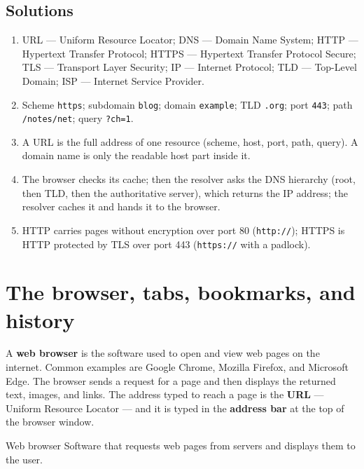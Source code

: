 \subsection*{Solutions}
\begingroup\small
\begin{enumerate}[label=\arabic*.]
  \item URL --- Uniform Resource Locator; DNS --- Domain Name System; HTTP
    --- Hypertext Transfer Protocol; HTTPS --- Hypertext Transfer Protocol
    Secure; TLS --- Transport Layer Security; IP --- Internet Protocol; TLD
    --- Top-Level Domain; ISP --- Internet Service Provider.
  \item Scheme \texttt{https}; subdomain \texttt{blog}; domain
    \texttt{example}; TLD \texttt{.org}; port \texttt{443}; path
    \texttt{/notes/net}; query \texttt{?ch=1}.
  \item A URL is the full address of one resource (scheme, host, port,
    path, query). A domain name is only the readable host part inside it.
  \item The browser checks its cache; then the resolver asks the DNS
    hierarchy (root, then TLD, then the authoritative server), which returns
    the IP address; the resolver caches it and hands it to the browser.
  \item HTTP carries pages without encryption over port 80
    (\texttt{http://}); HTTPS is HTTP protected by TLS over port 443
    (\texttt{https://} with a padlock).
\end{enumerate}
\endgroup

\section{The browser, tabs, bookmarks, and history}
A \textbf{web browser} is the software used to open and view web pages on the
internet. Common examples are Google Chrome, Mozilla Firefox, and Microsoft
Edge. The browser sends a request for a page and then displays the returned
text, images, and links. The address typed to reach a page is the \textbf{URL}
--- Uniform Resource Locator --- and it is typed in the \textbf{address bar}
at the top of the browser window.

\begin{definitionbox}{Web browser}
Software that requests web pages from servers and displays them to the user.
\end{definitionbox}

